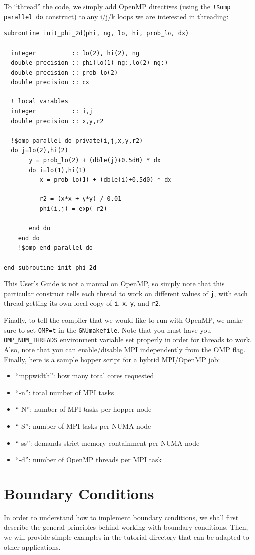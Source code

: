 To ``thread'' the code, we simply add OpenMP directives (using the {\tt !\$omp parallel do} construct) to any i/j/k loops
we are interested in threading:
\begin{lstlisting}[backgroundcolor=\color{light-green}]
subroutine init_phi_2d(phi, ng, lo, hi, prob_lo, dx)

  integer          :: lo(2), hi(2), ng
  double precision :: phi(lo(1)-ng:,lo(2)-ng:)
  double precision :: prob_lo(2)
  double precision :: dx
 
  ! local varables
  integer          :: i,j
  double precision :: x,y,r2

  !$omp parallel do private(i,j,x,y,r2)
  do j=lo(2),hi(2)
       y = prob_lo(2) + (dble(j)+0.5d0) * dx
       do i=lo(1),hi(1)
          x = prob_lo(1) + (dble(i)+0.5d0) * dx

          r2 = (x*x + y*y) / 0.01
          phi(i,j) = exp(-r2)

       end do
    end do
    !$omp end parallel do

end subroutine init_phi_2d
\end{lstlisting}
This User's Guide is not a manual on OpenMP, so simply note that this particular 
construct tells each thread to work on different values of {\tt j}, with each 
thread getting its own local copy of {\tt i}, {\tt x}, {\tt y}, and {\tt r2}.

Finally, to tell the compiler that we would like to run with OpenMP, we make sure to
set {\tt OMP=t} in the {\tt GNUmakefile}.  Note that you must have you 
{\tt OMP\_NUM\_THREADS} environment variable set properly in order for threads to work.
Also, note that you can enable/disable MPI independently from the OMP flag.  Finally,
here is a sample hopper script for a hybrid MPI/OpenMP job:

\begin{itemize}
\item ``mppwidth'': how many total cores requested
\item ``-n'': total number of MPI tasks
\item ``-N'': number of MPI tasks per hopper node
\item ``-S'': number of MPI tasks per NUMA node
\item ``-ss'': demands strict memory containment per NUMA node
\item ``-d'': number of OpenMP threads per MPI task
\end{itemize}
\section{Boundary Conditions}\label{Sec:Boundary Conditions}
In order to understand how to implement boundary conditions, we shall 
first describe the general principles behind working with boundary conditions.
Then, we will provide simple examples in the tutorial directory that can be 
adapted to other applications.

